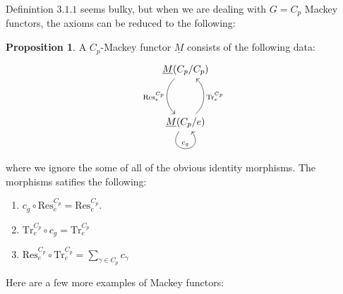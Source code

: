 \documentclass{article}
\theoremstyle{definition}
\theoremstyle{definition}
\theoremstyle{definition}
\theoremstyle{definition}
\newtheorem{proposition}{Proposition}[theorem]
\theoremstyle{definition}
\theoremstyle{definition}
\theoremstyle{definition}
\begin{document}
Definintion $3.1.1$ seems bulky, but when we are dealing with $G=C_p$ Mackey functors, the axioms can be reduced to the following: 

\begin{tcolorbox}[colback=blue!5!white,colframe=blue!30!white]
\begin{proposition}
A $C_p$-Mackey functor $\underline{M}$ consists of the following data: 
\[\begin{tikzcd}
	{\underline{M}(C_p/C_p)} \\
	\\
	{\underline{M}(C_p/e)}
	\arrow["{\textrm{Res}^{C_p}_{e}}",swap, bend right=50, from=1-1, to=3-1]
	\arrow["{\textrm{Tr}^{C_p}_{e}}",swap, bend right=50, from=3-1, to=1-1]
	\arrow["{c_g}", from=3-1, to=3-1, loop, in=305, out=235, distance=10mm]
\end{tikzcd}\]
where we ignore the some of all of the obvious identity morphisms. The morphisms satifies the following:
\begin{enumerate}
    \item $c_g\circ \textrm{Res}^{C_p}_{e}=\textrm{Res}^{C_p}_{e}$.
    \item ${\textrm{Tr}^{C_p}_{e}}\circ c_g={\textrm{Tr}^{C_p}_{e}}$
    \item $\textrm{Res}^{C_p}_{e}\circ \textrm{Tr}^{C_p}_{e}=\sum_{\gamma\in C_p}c_{\gamma}$
\end{enumerate}

\end{proposition}
\end{tcolorbox}
Here are a few more examples of Mackey functors:
\end{document}
